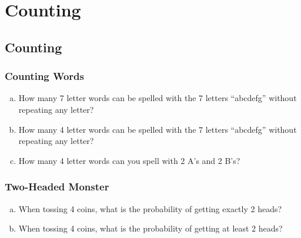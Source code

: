 \documentclass[9pt]{beamer}
\begin{document}
\section{Counting}
  \subsection{Counting}

\begin{frame}[fragile]
  \frametitle{Counting Words}
\begin{enumerate}[(a)]
\item How many 7 letter words can be spelled with the 7 letters ``abcdefg'' without repeating any letter?
 \\ \vspace{5.0mm}
\item How many 4 letter words can be spelled with the 7 letters ``abcdefg'' without repeating any letter?
 \\ \vspace{5.0mm}
\item How many 4 letter words can you spell with 2 A's and 2 B's?
\end{enumerate}
\end{frame}

\begin{frame}[fragile]
  \frametitle{Two-Headed Monster}
\begin{enumerate}[(a)]
\item When tossing 4 coins, what is the probability of getting exactly 2 heads?
 \\ \vspace{5.0mm}
\item When tossing 4 coins, what is the probability of getting at least 2 heads?
\end{enumerate}
\end{frame}
\end{document}
